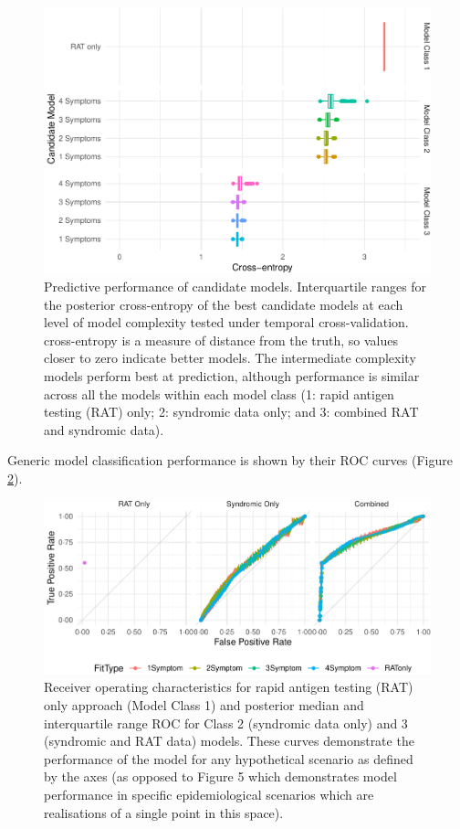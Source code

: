 \documentclass[]{elsarticle} %
\begin{document}
\begin{figure}
\includegraphics[width=1\linewidth]{0501_MainText_files/figure-latex/pred-perf-1} \caption{Predictive performance of candidate models. Interquartile ranges for the posterior cross-entropy of the best candidate models at each level of model complexity tested under temporal cross-validation. cross-entropy is a measure of distance from the truth, so values closer to zero indicate better models. The intermediate complexity models perform best at prediction, although performance is similar across all the models within each model class (1: rapid antigen testing (RAT) only; 2: syndromic data only; and 3: combined RAT and syndromic data).}\label{fig:pred-perf}
\end{figure}

Generic model classification performance is shown by their ROC curves (Figure \ref{fig:ROC-plot}).

\begin{figure}
\includegraphics[width=1\linewidth]{0501_MainText_files/figure-latex/ROC-plot-1} \caption{Receiver operating characteristics for rapid antigen testing (RAT) only approach (Model Class 1) and posterior median and interquartile range ROC for Class 2 (syndromic data only) and 3 (syndromic and RAT data) models. These curves demonstrate the performance of the model for any hypothetical scenario as defined by the axes (as opposed to Figure 5 which demonstrates model performance in specific epidemiological scenarios which are realisations of a single point in this space).}\label{fig:ROC-plot}
\end{figure}
\end{document}

